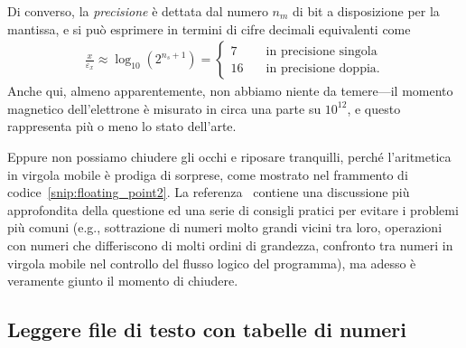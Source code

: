 Di converso, la \emph{precisione} è dettata dal numero $n_m$ di bit a disposizione
per la mantissa, e si può esprimere in termini di cifre decimali equivalenti
come
\begin{align*}
  \frac{x}{\varepsilon_x} \approx \log_{10} \left( 2^{n_s + 1}\right) =
  \begin{cases}
    7 \quad & \text{in precisione singola}\\
    16 \quad & \text{in precisione doppia}.
  \end{cases}
\end{align*}
Anche qui, almeno apparentemente, non abbiamo niente da temere---il momento magnetico
dell'elettrone è misurato in circa una parte su $10^{12}$, e questo
rappresenta più o meno lo stato dell'arte.


Eppure non possiamo chiudere gli occhi e riposare tranquilli, perché l'aritmetica in
virgola mobile è prodiga di sorprese, come mostrato nel frammento di
codice~\ref{snip:floating_point2}. La referenza~\cite{bush_floating_point}
contiene una discussione più approfondita della questione ed una serie di consigli
pratici per evitare i problemi più comuni (e.g., sottrazione di numeri molto grandi
vicini tra loro, operazioni con numeri che differiscono di molti ordini di grandezza,
confronto tra numeri in virgola mobile nel controllo del flusso logico del programma),
ma adesso è veramente giunto il momento di chiudere.



\subsection{Leggere file di testo con tabelle di numeri}
\label{sec:numpy_loadtxt}

